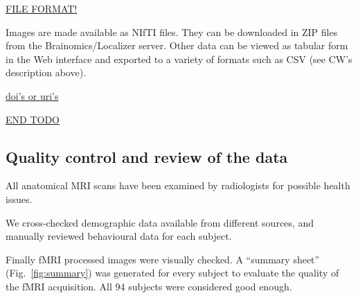 \documentclass[review]{elsarticle}
\begin{document}
\underline{FILE FORMAT!}

Images are made available as NIfTI files. They can be downloaded in ZIP files from the Brainomics/Localizer server. Other data can be viewed as tabular form in the Web interface and exported to a variety of formats such as CSV (see CW's description above).

\underline{doi's or uri's}

\underline{END TODO}


\subsection{Quality control and review of the data}

All anatomical MRI scans have been examined by radiologists for possible health issues.

We cross-checked demographic data available from different sources, and manually reviewed behavioural data for each subject.

Finally fMRI processed images were visually checked. A ``summary sheet'' (Fig.~\ref{fig:summary}) was generated for every subject to evaluate the quality of the fMRI acquisition. All 94 subjects were considered good enough.
\end{document}
